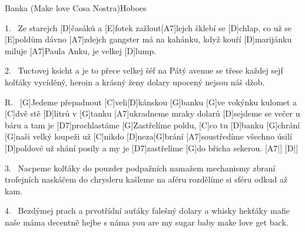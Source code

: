 \begin{song}{Banka (Make love Cosa Nostra)}{Hoboes}

\begin{xverse}{1.~}
Ze starejch [\large D]{}časáků a [\large E]fotek zažlout[\large A7]lejch
šklebí se [\large D]chlap, co už se [\large E]poldům dávno [\large A7]zdejch
gangster má na kahánku, když kouří [\large D]marijánku
miluje [\large A7]Paula Anku, je velkej [\large D]lump.
\end{xverse}

\begin{xverse}{2.~}
Tuctovej ksicht a je to přece velkej šéf
na Pátý avenue se třese každej sejf
kolťáky vycíděný, heroin a krásný ženy
dolary upocený nejsou náš džob.
\end{xverse}

\begin{xverse}{R.~}
[\large G]Jedeme přepadnout [\large C]veli[\large D]kánskou [\large G]banku
[\large G]ve vokýnku kulomet a [\large C]dvě stě [\large D]litrů v [\large G]tanku
[\large A7]ukradneme mraky dolarů
[\large D]sejdeme se večer u báru a tam je [\large D7]prochlastáme
[\large G]Zastřelíme poldu, [\large C]co tu [\large D]banku [\large G]chrání
[\large G]naši velký loupeži už [\large C]nikdo [\large D]neza[\large G]brání
[\large A7]soustředíme všechno úsilí
[\large D]poldové už shání posily a my je [\large D7]zastřelíme
[\large G]do břicha sekerou. [\large A7|]{} [\large D|]{}
\end{xverse}


\begin{xverse}{3.~}
Nacpeme kolťáky do pouzder podpažních
namažem mechanismy zbraní trofejních
naskáčem do chrysleru kašleme na aféru
rozdělíme si sféru odkud až kam.
\end{xverse}


\begin{xverse}{4.~}
Bezdýmej prach a prvotřídní auťáky
falešný dolary a whisky hekťáky
mafie naše máma decentně hejbe s náma
you are my sugar baby make love get back.
\end{xverse}


\end{song}

